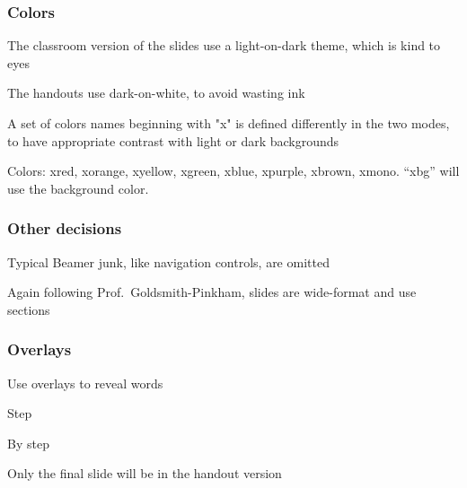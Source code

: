 \documentclass[aspectratio=169,handout]{beamer}
\begin{document}
\begin{frame}
	\frametitle{Colors}
	\begin{witem}
		\item The classroom version of the slides use a light-on-dark theme,
			which is kind to eyes
		\item The handouts use dark-on-white, to avoid wasting ink
        \item A set of colors names beginning with "x" is defined differently
            in the two modes, to have appropriate contrast with light or dark
            backgrounds
        \item Colors: {\color{xred} xred},
             {\color{xorange} xorange},
             {\color{xyellow} xyellow},
             {\color{xgreen} xgreen},
             {\color{xblue} xblue},
             {\color{xpurple} xpurple},
             {\color{xbrown} xbrown},
             {\color{xmono} xmono}. ``xbg'' will use the background color.
	\end{witem}
\end{frame}



\begin{frame}
	\frametitle{Other decisions}
	\begin{witem}
		\item Typical Beamer junk, like navigation controls, are omitted
		\item Again following Prof.\ Goldsmith-Pinkham, slides are wide-format
			and use sections
	\end{witem}
\end{frame}




\begin{frame}
	\frametitle{Overlays}
	\begin{witemplus}
		\item Use overlays to reveal words
		\item Step
		\item By step
		\item Only the final slide will be in the handout version
	\end{witemplus}
\end{frame}
\end{document}
